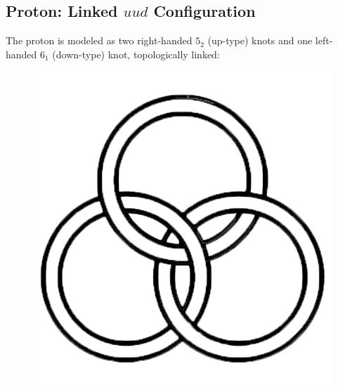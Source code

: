 \documentclass[12pt]{article}
\begin{document}
\subsection{Proton: Linked \(uud\) Configuration}

The proton is modeled as two right-handed \( 5_2 \) (up-type) knots and one left-handed \( 6_1 \) (down-type) knot, topologically linked:


  \begin{figure}[H]
\centering
\begin{minipage}{0.25\textwidth}
    \centering
             \includegraphics[width=\textwidth]{images/aborromean}
\end{minipage}
\hspace{1em}
\begin{minipage}{0.25\textwidth}
    \centering

\end{minipage}
\end{figure}
\end{document}
